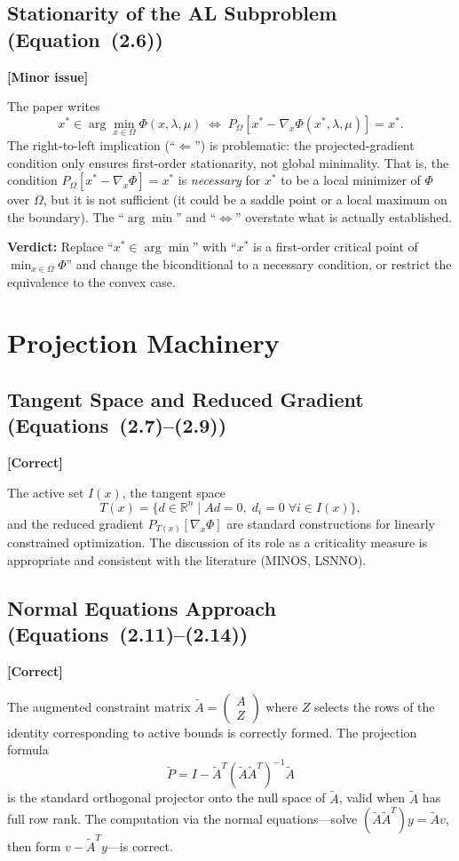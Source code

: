 \documentclass[11pt]{article}
\newcommand{\RR}{\mathbb{R}}
\newcommand{\proj}[2]{P_{#1}\!\left[#2\right]}
\newcommand{\verdict}[1]{\par\medskip\noindent\textbf{Verdict:} #1\par\medskip}
\newcommand{\statusok}{\textcolor{okcolor}{\textbf{[Correct]}}}
\newcommand{\statuswarn}{\textcolor{warncolor}{\textbf{[Minor issue]}}}
\theoremstyle{plain}
\begin{document}
\subsection{Stationarity of the AL Subproblem (Equation~(2.6))}
\statuswarn

The paper writes
\[
x^*\in \arg\min_{x\in\Omega}\Phi(x,\lambda,\mu) \;\iff\; \proj{\Omega}{x^*-\nabla_x\Phi(x^*,\lambda,\mu)}=x^*.
\]
The right-to-left implication (``$\Leftarrow$'') is problematic: the projected-gradient condition only ensures first-order stationarity, not global minimality. That is, the condition $\proj{\Omega}{x^* - \nabla_x\Phi} = x^*$ is \emph{necessary} for $x^*$ to be a local minimizer of $\Phi$ over $\Omega$, but it is not sufficient (it could be a saddle point or a local maximum on the boundary). The ``$\arg\min$'' and ``$\iff$'' overstate what is actually established.

\verdict{Replace ``$x^*\in\arg\min$'' with ``$x^*$ is a first-order critical point of $\min_{x\in\Omega}\Phi$'' and change the biconditional to a necessary condition, or restrict the equivalence to the convex case.}


\section{Projection Machinery}

\subsection{Tangent Space and Reduced Gradient (Equations~(2.7)--(2.9))}
\statusok

The active set $I(x)$, the tangent space
\[
T(x) = \{d \in \RR^n \mid Ad = 0,\; d_i = 0\;\forall i\in I(x)\},
\]
and the reduced gradient $\proj{T(x)}{\nabla_x\Phi}$ are standard constructions for linearly constrained optimization. The discussion of its role as a criticality measure is appropriate and consistent with the literature (MINOS, LSNNO).

\subsection{Normal Equations Approach (Equations~(2.11)--(2.14))}
\statusok

The augmented constraint matrix $\tilde{A} = \begin{pmatrix} A \\ Z \end{pmatrix}$ where $Z$ selects the rows of the identity corresponding to active bounds is correctly formed. The projection formula
\[
\tilde{P} = I - \tilde{A}^T(\tilde{A}\tilde{A}^T)^{-1}\tilde{A}
\]
is the standard orthogonal projector onto the null space of $\tilde{A}$, valid when $\tilde{A}$ has full row rank. The computation via the normal equations---solve $(\tilde{A}\tilde{A}^T)y = \tilde{A}v$, then form $v - \tilde{A}^Ty$---is correct.
\end{document}
